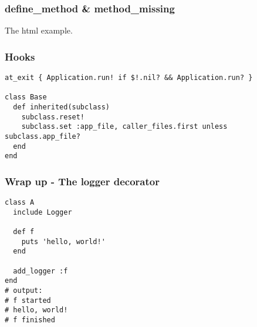 \documentclass[11pt]{beamer}
\begin{document}
\begin{frame}[fragile]
\frametitle{define\_method \& method\_missing}
    The html example.
\end{frame}

\begin{frame}[fragile]
\frametitle{Hooks}
\begin{verbatim}
at_exit { Application.run! if $!.nil? && Application.run? }

class Base
  def inherited(subclass)
    subclass.reset!
    subclass.set :app_file, caller_files.first unless subclass.app_file?
  end
end
\end{verbatim}
\end{frame}

\begin{frame}[fragile]
\frametitle{Wrap up - The logger decorator}
\begin{verbatim}
class A
  include Logger

  def f
    puts 'hello, world!'
  end

  add_logger :f
end
# output:
# f started
# hello, world!
# f finished
\end{verbatim}
\end{frame}
\end{document}
